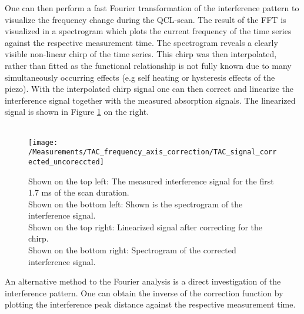 One can then perform a fast Fourier transformation of the interference pattern to visualize the frequency change during the QCL-scan.  The result of the FFT is visualized in a spectrogram which plots the current frequency of the time series against the respective measurement time. The spectrogram reveals a clearly visible non-linear chirp of the time series. This chirp was then interpolated, rather than fitted as the functional relationship is not fully known due to many simultaneously occurring effects (e.g self heating or hysteresis effects of the piezo). With the interpolated chirp signal one can then correct and linearize the interference signal together with the measured absorption signals. The linearized signal is shown in Figure \ref{fig:TAC_interference_pattern} on the right.\\\\
\begin{figure}[H]
	\centering
	\texttt{[image: /Measurements/TAC\_frequency\_axis\_correction/TAC\_signal\_corrected\_uncoreccted]}
	\caption{Shown on the top left: The measured interference signal for the first 1.7 ms of the scan duration.\\
	Shown on the bottom left: Shown is the spectrogram of the interference signal.\\
	Shown on the top right: Linearized signal after correcting for the chirp.\\
	Shown on the bottom right: Spectrogram of the corrected interference signal.}
	\label{fig:TAC_interference_pattern}
\end{figure}
\noindent
An alternative method to the Fourier analysis is a direct investigation of the interference pattern. One can obtain the inverse of the correction function by plotting the interference peak distance against the respective measurement time.
\newpage
